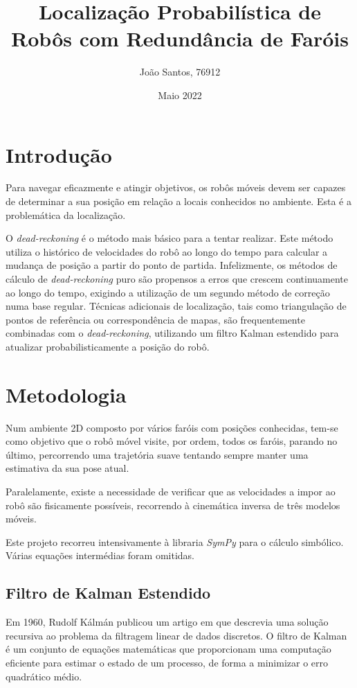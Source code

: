 \documentclass{article}
\title{Localização Probabilística de Robôs com Redundância de Faróis}
\author[1]{João Santos, 76912}
\affil[1]{Departamento de Eletrónica, Telecomunicações e Informática, Universidade de Aveiro}
\date{Maio 2022}
\begin{document}
\maketitle

\section{Introdução}

Para navegar eficazmente e atingir objetivos, os robôs móveis devem ser capazes de determinar a sua posição em relação a locais conhecidos no ambiente. Esta é a problemática da localização.

O \textit{dead-reckoning} é o método mais básico para a tentar realizar\cite{833191}. Este método utiliza o histórico de velocidades do robô ao longo do tempo para calcular a mudança de posição a partir do ponto de partida. Infelizmente, os métodos de cálculo de \textit{dead-reckoning} puro são propensos a erros que crescem continuamente ao longo do tempo, exigindo a utilização de um segundo método de correção numa base regular. Técnicas adicionais de localização, tais como triangulação de pontos de referência ou correspondência de mapas, são frequentemente combinadas com o \textit{dead-reckoning}, utilizando um filtro Kalman estendido para atualizar probabilisticamente a posição do robô.

\section{Metodologia}

Num ambiente 2D composto por vários faróis com posições conhecidas, tem-se como objetivo que o robô móvel visite, por ordem, todos os faróis, parando no último, percorrendo uma trajetória suave tentando sempre manter uma estimativa da sua pose atual.

Paralelamente, existe a necessidade de verificar que as velocidades a impor ao robô são fisicamente possíveis, recorrendo à cinemática inversa de três modelos móveis.

Este projeto recorreu intensivamente à libraria \textit{SymPy}\cite{sympy} para o cálculo simbólico. Várias equações intermédias foram omitidas.

\subsection{Filtro de Kalman Estendido}

Em 1960, Rudolf Kálmán publicou um artigo\cite{kalman1960} em que descrevia uma solução recursiva ao problema da filtragem linear de dados discretos. O filtro de Kalman é um conjunto de equações matemáticas que proporcionam uma computação eficiente para estimar o estado de um processo, de forma a minimizar o erro quadrático médio.
\end{document}
